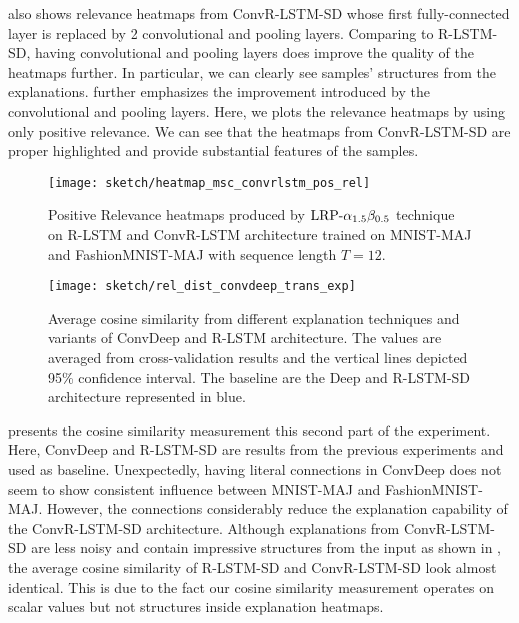 \addfigure{\ref{fig:heatmap_msc_convtran_exp}} also shows relevance heatmaps from ConvR-LSTM-SD whose first fully-connected layer is replaced by 2 convolutional and pooling layers. Comparing to R-LSTM-SD, having convolutional and pooling layers does improve  the quality of the heatmaps further. In particular, we can clearly see samples' structures from the explanations. \addfigure{\ref{fig:heatmap_msc_convrlstm_pos_rel}} further emphasizes the improvement introduced by the convolutional and pooling layers. Here, we plots the relevance heatmaps by using only positive relevance. We can see that the heatmaps from ConvR-LSTM-SD are proper highlighted and provide substantial  features of the samples.

 \begin{figure}[!htb]
\centering
\texttt{[image: sketch/heatmap\_msc\_convrlstm\_pos\_rel]}
\caption{Positive Relevance heatmaps produced by $\text{LRP-}\alpha_{1.5}\beta_{0.5}$ technique on R-LSTM and ConvR-LSTM architecture trained on MNIST-MAJ and FashionMNIST-MAJ with sequence length $T=12$. \heatmapscaleexplain} 
\label{fig:heatmap_msc_convrlstm_pos_rel}
\end{figure}

 \begin{figure}[!htb]
\centering
\texttt{[image: sketch/rel\_dist\_convdeep\_trans\_exp]}
\caption{Average cosine similarity from different explanation techniques and variants of ConvDeep and R-LSTM architecture. The values are averaged from cross-validation results and the vertical lines depicted 95\% confidence interval. The baseline are the Deep and R-LSTM-SD architecture represented in blue.} 
\label{fig:rel_dist_convdeep_trans_exp}
\end{figure}

\addfigure{\ref{fig:rel_dist_convdeep_trans_exp}} presents the cosine similarity measurement this second part of the experiment. Here, ConvDeep and R-LSTM-SD are results from the previous experiments and used as baseline. Unexpectedly, having literal connections in ConvDeep does not seem to show consistent influence between MNIST-MAJ and FashionMNIST-MAJ. However, the connections considerably reduce the explanation capability of the ConvR-LSTM-SD architecture. 
 Although explanations from ConvR-LSTM-SD are less noisy and contain impressive structures from the input as shown in \addfigure{\ref{fig:heatmap_msc_convrlstm_pos_rel}}, the average cosine similarity of R-LSTM-SD and ConvR-LSTM-SD look almost identical. This is due to the fact our cosine similarity measurement operates on scalar values but not structures inside explanation heatmaps.
 
